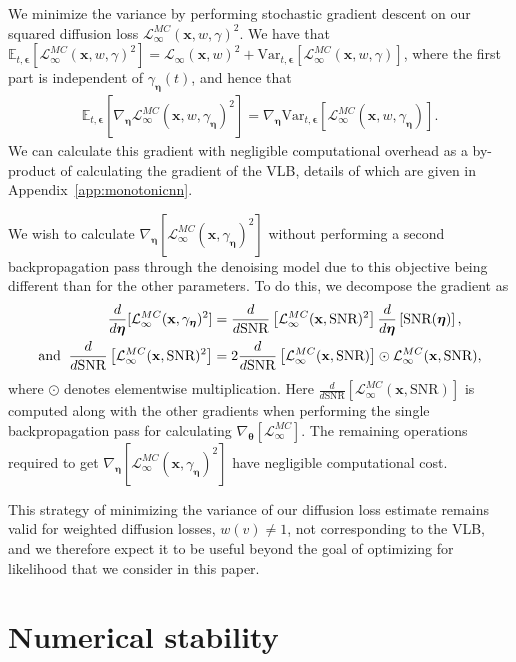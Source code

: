\documentclass{article}
\def\rvx{{\mathbf{x}}}
\newcommand{\E}{\mathbb{E}}
\newcommand{\Var}{\mathrm{Var}}
\newcommand{\bT}{{\boldsymbol{\theta}}}
\newcommand{\boldeta}{{\boldsymbol{\eta}}}
\newcommand{\bepsilon}{{\boldsymbol{\epsilon}}}
\newcommand{\snr}{\text{SNR}}
\begin{document}
We minimize the variance by performing stochastic gradient descent on our squared diffusion loss $\mathcal{L}^{MC}_{\infty}(\rvx,w,\gamma)^{2}$. We have that $\E_{t,\bepsilon}[\mathcal{L}^{MC}_{\infty}(\rvx,w,\gamma)^{2}] = \mathcal{L}_{\infty}(\rvx,w)^{2} + \Var_{t,\bepsilon}[\mathcal{L}^{MC}_{\infty}(\rvx,w,\gamma)]$, where the first part is independent of $\gamma_{\boldeta}(t)$, and hence that
\begin{align}
\E_{t,\bepsilon}[\nabla_{\boldeta} \mathcal{L}^{MC}_{\infty}(\rvx,w,\gamma_{\boldeta})^{2}] =    \nabla_{\boldeta} \Var_{t,\bepsilon}[\mathcal{L}^{MC}_{\infty}(\rvx,w,\gamma_{\boldeta})].
\end{align}
We can calculate this gradient with negligible computational overhead as a by-product of calculating the gradient of the VLB, details of which are given in Appendix~\ref{app:monotonicnn}.

We wish to calculate $\nabla_{\boldeta}[ \mathcal{L}^{MC}_{\infty}(\rvx,\gamma_{\boldeta})^{2}]$ without performing a second backpropagation pass through the denoising model due to this objective being different than for the other parameters. To do this, we decompose the gradient as
\begin{align}
\frac{d}{d \boldeta}[ \mathcal{L}^{MC}_{\infty}(\rvx,\gamma_{\boldeta})^{2}] &= \frac{d}{d \snr}\left[ \mathcal{L}^{MC}_{\infty}(\rvx,\snr)^{2}\right]\frac{d}{d \boldeta}\left[\snr(\boldeta)\right],\\
\text{and\;\;} \frac{d}{d \snr}\left[ \mathcal{L}^{MC}_{\infty}(\rvx,\snr)^{2}\right] &= 2\frac{d}{d \snr}\left[ \mathcal{L}^{MC}_{\infty}(\rvx,\snr)\right] \odot \mathcal{L}^{MC}_{\infty}(\rvx,\snr),
\end{align}
where $\odot$ denotes elementwise multiplication.
Here $\frac{d}{d \snr}\left[ \mathcal{L}^{MC}_{\infty}(\rvx,\snr)\right]$ is computed along with the other gradients when performing the single backpropagation pass for calculating $\nabla_{\bT}[ \mathcal{L}^{MC}_{\infty}]$. The remaining operations required to get $\nabla_{\boldeta} [\mathcal{L}^{MC}_{\infty}(\rvx,\gamma_{\boldeta})^{2}]$ have negligible computational cost.

This strategy of minimizing the variance of our diffusion loss estimate remains valid for weighted diffusion losses, $w(v) \neq 1$, not corresponding to the VLB, and we therefore expect it to be useful beyond the goal of optimizing for likelihood that we consider in this paper.

\section{Numerical stability}
\label{sec:stable}
\end{document}
